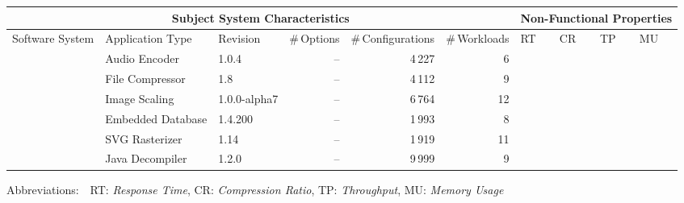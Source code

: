\begin{tabularx}{\textwidth}{lllrrr|XXXX}
		\toprule
		\multicolumn{6}{c}{\textbf{Subject System Characteristics}} & \multicolumn{4}{c}{\textbf{Non-Functional Properties}} \\
		\midrule
		Software System &  Application Type & Revision & \#\,Options & \#\,Configurations & \#\,Workloads & RT & CR & TP & MU \\
		\midrule
		\jumper & Audio Encoder & 1.0.4 & -- & 4\,227 & 6 & \checkmark & \checkmark &  & \checkmark  \\
		
		\kanzi & File Compressor & 1.8 & -- & 4\,112 & 9 & \checkmark & \checkmark &  & \checkmark  \\
			
		\dconvert & Image Scaling & 1.0.0-alpha7 & -- & 6\,764 & 12 & \checkmark  &  &  & \checkmark  \\
				
		\htwo & Embedded Database & 1.4.200 & -- & 1\,993  & 8 &   &  & \checkmark &  \\
		
		\batik & SVG Rasterizer & 1.14 & -- & 1\,919 &  11 & \checkmark &   &  & \checkmark  \\
		
		\jadx & Java Decompiler & 1.2.0 & -- & 9\,999 & 9 & \checkmark &  &  & \checkmark  \\
			
		

		
		
		
		
		\bottomrule
	\end{tabularx}
	
	{\vspace{2mm}
	{\footnotesize Abbreviations:$\quad$RT: \textit{Response Time}, CR: \textit{Compression Ratio}, TP: \textit{Throughput}, MU: \textit{Memory Usage}}}
	\vspace{0.1cm}
